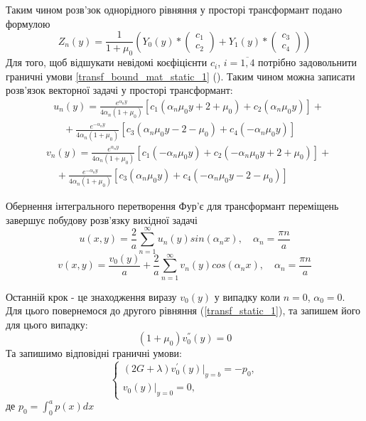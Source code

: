 Таким чином розв'зок однорідного рівняння у просторі трансформант подано формулою
\begin{equation}
    Z_n(y) = \frac{1}{1 + \mu_0} \left( Y_0(y) * \begin{pmatrix} c_1 \\ c_2 \end{pmatrix} +  Y_1(y) * \begin{pmatrix} c_3 \\ c_4 \end{pmatrix}  \right)
\end{equation}
Для того, щоб відшукати невідомі коєфіцієнти $c_i$, $i=\overline{1, 4}$ потрібно задовольнити граничні умови \eqref{transf_bound_mat_static_1} ().
Таким чином можна записати розв'язок векторної задачі у просторі трансформант:
\begin{align}\label{transf_sol_u_static_1}
    &u_n(y) = \frac{e^{\alpha_n y}}{4 \alpha_n (1 + \mu_0)} \left[c_1 (\alpha_n \mu_0 y + 2 + \mu_0) + c_2 (\alpha_n \mu_0 y) \right] + \nonumber \\
    &\quad + \frac{e^{-\alpha_n y}}{4 \alpha_n (1 + \mu_0)} \left[c_3 (\alpha_n \mu_0 y - 2 - \mu_0) + c_4 (-\alpha_n \mu_0 y)\right]
\end{align}
\begin{align}\label{transf_sol_v_static_1}
    &v_n(y) = \frac{e^{\alpha_n y}}{4 \alpha_n (1 + \mu_0)} \left[c_1 (-\alpha_n \mu_0 y) + c_2 (-\alpha_n \mu_0 y + 2 + \mu_0) \right] + \nonumber \\
    &\quad + \frac{e^{-\alpha_n y}}{4 \alpha_n (1 + \mu_0)} \left[c_3 (\alpha_n \mu_0 y) + c_4 (-\alpha_n \mu_0 y - 2 - \mu_0)\right]
\end{align}

Обернення інтегрального перетворення Фур'є для трансформант переміщень завершує побудову розв'язку вихідної задачі
\begin{equation}
    u(x,y) = \frac{2}{a} \sum_{n=1}^{\infty} u_n(y) sin(\alpha_n x), \quad \alpha_n = \frac{\pi n}{a}
\end{equation}
\begin{equation}
    v(x,y) = \frac{v_0(y)}{a} + \frac{2}{a} \sum_{n=1}^{\infty} v_n(y) cos(\alpha_n x), \quad \alpha_n = \frac{\pi n}{a}
\end{equation}

Останній крок - це знаходження виразу $v_0(y)$ у випадку коли $n=0$, $\alpha_0 =0$.
Для цього повернемося до другого рівняння (\ref{transf_static_1}), та запишем його для цього випадку:
\begin{equation}\label{transf_v_0_static_1}
    (1 + \mu_0) v_0^{''}(y) = 0
\end{equation}
Та запишимо відповідні граничні умови:
\begin{equation}\label{transf_bound_v_0_static_1}
    \begin{cases}
        (2G + \lambda)v_0^{'}(y)|_{y=b} = -p_0, \\
        v_0(y)|_{y=0} = 0,
    \end{cases}
\end{equation}
де $p_0 = \int_{0}^{a}p(x)dx$

